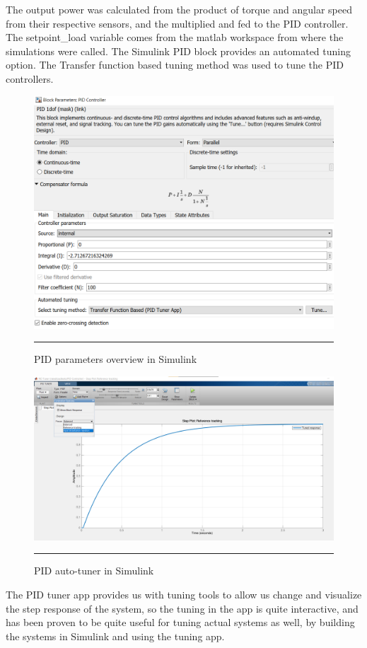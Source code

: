The output power was calculated from the product of torque and angular speed from their respective sensors, and the multiplied and fed to the PID controller. The setpoint\_load variable comes from the matlab workspace from where the simulations were called.
The Simulink PID block provides an automated tuning option. The Transfer function based tuning method was used to tune the PID controllers.

\begin{figure}[htbp]
	\centering
		\includegraphics[width = 4.5in]{./Figures/MS/fig319.png}
		\rule{35em}{0.5pt}
	\caption{PID parameters overview in Simulink}
	\label{fig:PID parameters overview in Simulink}
\end{figure}

\begin{figure}[htbp]
	\centering
		\includegraphics[width = 4.5in]{./Figures/MS/fig320.png}
		\rule{35em}{0.5pt}
	\caption{PID auto-tuner in Simulink}
	\label{fig:PID auto-tuner in Simulink}
\end{figure}
The PID tuner app provides us with tuning tools to allow us change and visualize the step response of the system, so the tuning in the app is quite interactive, and has been proven to be quite useful for tuning actual systems as well\cite{wang2020pid}, by building the systems in Simulink and using the tuning app.

